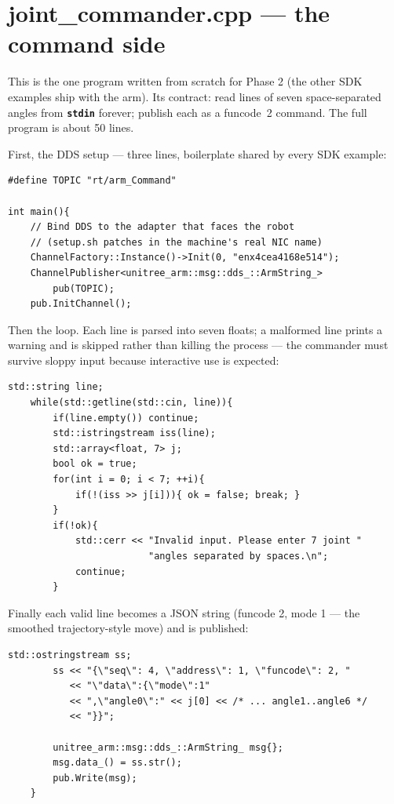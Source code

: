 \documentclass[11pt,twoside,openright]{book}
\newcommand{\code}[1]{\texttt{\bfseries #1}}
\newcommand{\codefile}[1]{%
  \par\vspace{10pt}\noindent{\ttfamily\small\bfseries #1}\par\nopagebreak\vspace{-8pt}}
\begin{document}
\section{joint\_commander.cpp --- the command side}

This is the one program written from scratch for Phase 2 (the other SDK
examples ship with the arm). Its contract: read lines of seven
space-separated angles from \code{stdin} forever; publish each as a
funcode~2 command. The full program is about 50 lines.

First, the DDS setup --- three lines, boilerplate shared by every SDK
example:

\codefile{d1\_sdk/src/joint\_commander.cpp}
\begin{lstlisting}[style=pktcpp]
#define TOPIC "rt/arm_Command"

int main(){
    // Bind DDS to the adapter that faces the robot
    // (setup.sh patches in the machine's real NIC name)
    ChannelFactory::Instance()->Init(0, "enx4cea4168e514");
    ChannelPublisher<unitree_arm::msg::dds_::ArmString_>
        pub(TOPIC);
    pub.InitChannel();
\end{lstlisting}

Then the loop. Each line is parsed into seven floats; a malformed line
prints a warning and is skipped rather than killing the process --- the
commander must survive sloppy input because interactive use is expected:

\begin{lstlisting}[style=pktcpp]
    std::string line;
    while(std::getline(std::cin, line)){
        if(line.empty()) continue;
        std::istringstream iss(line);
        std::array<float, 7> j;
        bool ok = true;
        for(int i = 0; i < 7; ++i){
            if(!(iss >> j[i])){ ok = false; break; }
        }
        if(!ok){
            std::cerr << "Invalid input. Please enter 7 joint "
                         "angles separated by spaces.\n";
            continue;
        }
\end{lstlisting}

Finally each valid line becomes a JSON string (funcode 2, mode 1 --- the
smoothed trajectory-style move) and is published:

\begin{lstlisting}[style=pktcpp]
        std::ostringstream ss;
        ss << "{\"seq\": 4, \"address\": 1, \"funcode\": 2, "
           << "\"data\":{\"mode\":1"
           << ",\"angle0\":" << j[0] << /* ... angle1..angle6 */
           << "}}";

        unitree_arm::msg::dds_::ArmString_ msg{};
        msg.data_() = ss.str();
        pub.Write(msg);
    }
\end{lstlisting}
\end{document}

